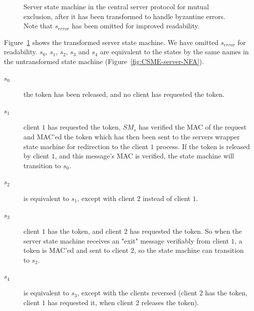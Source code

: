 \documentclass{article}
\begin{document}
		\FloatBarrier
		\begin{figure}[ht!]
			\center
			\caption{Server state machine in the central server protocol for mutual exclusion, after it has been transformed to handle byzantine errors. Note that $s_{error}$ has been omitted for improved readability.}
			\label{fig:CSME-server-NFA-transformed}
		\end{figure}
		\FloatBarrier

		Figure~\ref{fig:CSME-server-NFA-transformed} shows the transformed server state machine.
		We have omitted $s_{error}$ for readability.
		$s_0$, $s_1$, $s_2$, $s_3$ and $s_4$ are equivalent to the states by the same names in the untransformed state machine (Figure~\ref{fig:CSME-server-NFA}).

		\begin{description}
			\item[$s_0$] the token has been released, and no client has requested the token.
			\item[$s_1$] client $1$ has requested the token, $SM_s$ has verified the MAC of the request and MAC'ed the token which has then been sent to the servers wrapper state machine for redirection to the client $1$ process.
			If the token is released by client $1$, and this message's MAC is verified, the state machine will transition to $s_0$.
			\item[$s_2$] is equivalent to $s_1$, except with client $2$ instead of client $1$.
			\item[$s_3$] client $1$ has the token, and client $2$ has requested the token.
			So when the server state machine receives an "exit" message verifiably from client $1$, a token is MAC'ed and sent to client $2$, so the state machine can transition to $s_2$.
			\item[$s_4$] is equivalent to $s_3$, except with the clients reversed (client $2$ has the token, client $1$ has requested it, when client $2$ releases the token).
		\end{description}
\end{document}
